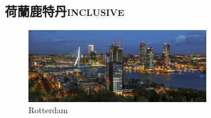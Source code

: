 \documentclass[a4paper,12pt]{article}
\begin{document}
\subsection{荷蘭鹿特丹\hfill{}\textsc{inclusive}}
\label{sec:org1f450d6}
\begin{figure}[htbp]
\centering
\includegraphics[width=300]{images/Rotterdam.jpg}
\caption{\label{fig:Rotterdam-1}Rotterdam}
\end{figure}
\end{document}

